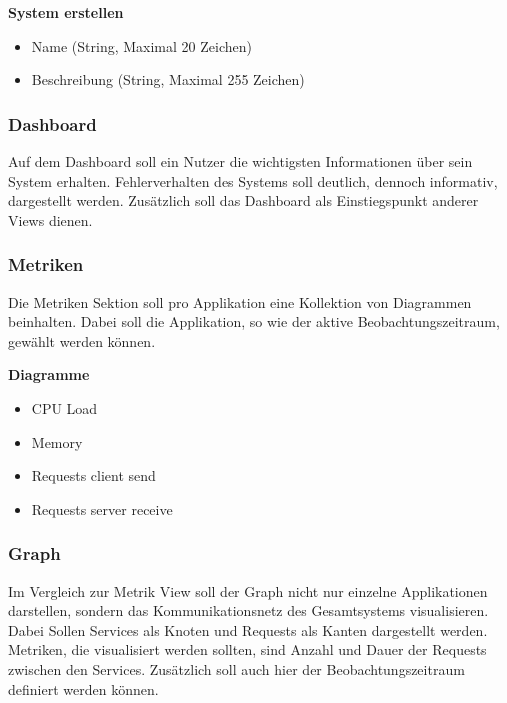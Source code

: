 \vspace{1cm}
\textbf{System erstellen}

\begin{itemize}
\item Name (String, Maximal 20 Zeichen)
\item Beschreibung (String, Maximal 255 Zeichen)
\end{itemize}

\vspace{1cm}

\subsubsection{Dashboard}

Auf dem Dashboard soll ein Nutzer die wichtigsten Informationen über sein System erhalten.
Fehlerverhalten des Systems soll deutlich, dennoch informativ, dargestellt werden.
Zusätzlich soll das Dashboard als Einstiegspunkt anderer Views dienen.

\subsubsection{Metriken}

Die Metriken Sektion soll pro Applikation eine Kollektion von Diagrammen beinhalten.
Dabei soll die Applikation, so wie der aktive Beobachtungszeitraum, gewählt werden können.

\vspace{1cm}
\textbf{Diagramme}

\begin{itemize}
\item CPU Load
\item Memory
\item Requests client send
\item Requests server receive
\end{itemize}

\vspace{1cm}

\subsubsection{Graph}

Im Vergleich zur Metrik View soll der Graph nicht nur einzelne Applikationen darstellen,
sondern das Kommunikationsnetz des Gesamtsystems visualisieren.
Dabei Sollen Services als Knoten und Requests als Kanten dargestellt werden.
Metriken, die visualisiert werden sollten, sind Anzahl und Dauer der Requests zwischen den Services.
Zusätzlich soll auch hier der Beobachtungszeitraum definiert werden können.


